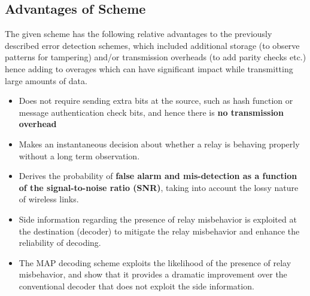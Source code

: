 \documentclass[conference]{IEEEtran}
\begin{document}
\subsection{Advantages of Scheme}
The given scheme has the following relative advantages to the previously described error detection schemes, which included additional storage (to observe patterns for tampering) and/or transmission overheads (to add parity checks etc.) hence adding to overages which can have significant impact while transmitting large amounts of data. 
\begin{itemize}
\item Does not require sending extra bits at the source, such as hash function or message authentication check bits, and hence there is \textbf{no transmission overhead} 
\item Makes an instantaneous decision about whether a relay is behaving properly without a long term observation. 
\item Derives the probability of \textbf{false alarm and mis-detection as a function of the signal-to-noise ratio (SNR)}, taking into account the lossy nature of wireless links. 
\item Side information regarding the presence of relay misbehavior is exploited at the destination (decoder) to mitigate the relay misbehavior and enhance the reliability of decoding.
\item The MAP decoding scheme exploits the likelihood of the presence of relay misbehavior, and show that it provides a dramatic improvement over the conventional decoder that does not exploit the side information.
\end{itemize}
\end{document}
